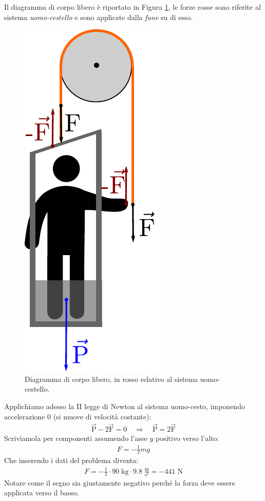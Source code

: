 \documentclass[12pt,a4paper]{book}
\begin{document}
Il diagramma di corpo libero è riportato in Figura \ref{fig:4-e-17-2}, le forze rosse sono riferite al sistema \textit{uomo-cestello} e sono applicate dalla \textit{fune} su di esso.


\begin{figure}[ht!]
\centering
\includegraphics[scale=0.62]{e-17-2.pdf}
\caption{Diagramma di corpo libero, in rosso relativo al sistema uomo-cestello.} 
\label{fig:4-e-17-2} 
\end{figure}

Applichiamo adesso la II legge di Newton al sistema uomo-cesto, imponendo accelerazione 0 (si muove di velocità costante):
%
\begin{gather*}
\vec{\text{P}}-2\vec{\text{F}}=0 \quad \Longrightarrow \quad \vec{\text{P}}=2\vec{\text{F}}
\end{gather*}
%
Scriviamola per componenti assumendo l'asse $y$ positivo verso l'alto:
%
\begin{gather*}
F=-\frac{1}{2}mg
\end{gather*}
%
Che inserendo i dati del problema diventa:
%
\begin{gather*}
F=-\frac{1}{2} \cdot 90\;\text{kg} \cdot 9.8 \;\frac{\text{m}}{\text{s}^2}=-441\;\text{N}
\end{gather*}
%
Notare come il segno sia giustamente negativo perché la forza deve essere applicata verso il basso.
\end{document}
